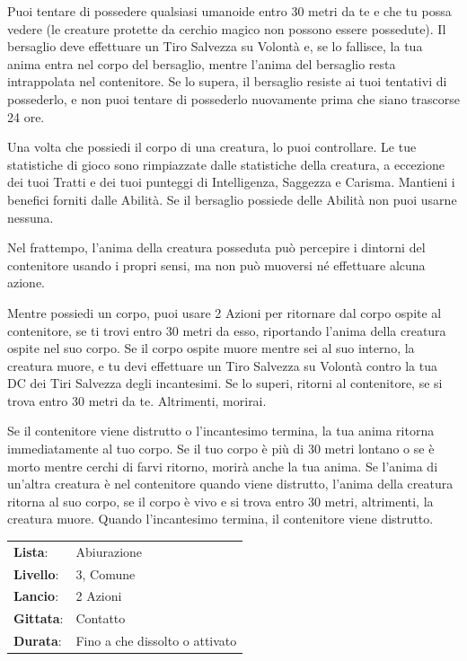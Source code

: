 \begin{multicols}{2}
Puoi tentare di possedere qualsiasi umanoide entro 30 metri da te e che tu possa vedere (le creature protette da cerchio magico non possono essere possedute). Il bersaglio deve effettuare un Tiro Salvezza su Volontà e, se lo fallisce, la tua anima entra nel corpo del bersaglio, mentre l'anima del bersaglio resta intrappolata nel contenitore. Se lo supera, il bersaglio resiste ai tuoi tentativi di possederlo, e non puoi tentare di possederlo nuovamente prima che siano trascorse 24 ore.

Una volta che possiedi il corpo di una creatura, lo puoi controllare. Le tue statistiche di gioco sono rimpiazzate dalle statistiche della creatura, a eccezione dei tuoi Tratti e dei tuoi punteggi di Intelligenza, Saggezza e Carisma. Mantieni i benefici forniti dalle Abilità. Se il bersaglio possiede delle Abilità non puoi usarne nessuna.

Nel frattempo, l'anima della creatura posseduta può percepire i dintorni del contenitore usando i propri sensi, ma non può muoversi né effettuare alcuna azione.

Mentre possiedi un corpo, puoi usare 2 Azioni per ritornare dal corpo ospite al contenitore, se ti trovi entro 30 metri da esso, riportando l'anima della creatura ospite nel suo corpo. Se il corpo ospite muore mentre sei al suo interno, la creatura muore, e tu devi effettuare un Tiro Salvezza su Volontà contro la tua DC dei Tiri Salvezza degli incantesimi. Se lo superi, ritorni al contenitore, se si trova entro 30 metri da te. Altrimenti, morirai.

Se il contenitore viene distrutto o l'incantesimo termina, la tua anima ritorna immediatamente al tuo corpo. Se il tuo corpo è più di 30 metri lontano o se è morto mentre cerchi di farvi ritorno, morirà anche la tua anima. Se l'anima di un'altra creatura è nel contenitore quando viene distrutto, l'anima della creatura ritorna al suo corpo, se il corpo è vivo e si trova entro 30 metri, altrimenti, la creatura muore. Quando l'incantesimo termina, il contenitore viene distrutto.

\noindent\begin{tabularx}{\linewidth}{p{1.3cm}X}
	\rowcolor{gray!20}\textbf{Lista}: & Abiurazione \\
	\textbf{Livello}: & 3, Comune \\
	\rowcolor{gray!20}\textbf{Lancio}: & 2 Azioni \\
	\textbf{Gittata}: & Contatto \\
	\rowcolor{gray!20}\textbf{Durata}: & Fino a che dissolto o attivato \\
\end{tabularx}\smallskip


\end{multicols}
